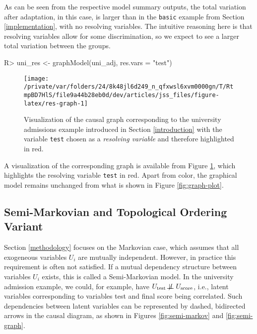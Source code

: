 \documentclass[
  nojss]{jss}
\begin{document}
As can be seen from the respective model summary outputs, the total
variation after adaptation, in this case, is larger than in the
\texttt{basic} example from Section \ref{implementation}, with no
resolving variables. The intuitive reasoning here is that resolving
variables allow for some discrimination, so we expect to see a larger
total variation between the groups.

\begin{CodeChunk}
\begin{CodeInput}
R> uni_res <- graphModel(uni_adj, res.vars = "test")
\end{CodeInput}
\end{CodeChunk}

\begin{CodeChunk}
\begin{figure}

{\centering \texttt{[image: /private/var/folders/24/8k48jl6d249\_n\_qfxwsl6xvm0000gn/T/RtmpBD7HlS/file9a44b28eb0d/dev/articles/jss\_files/figure-latex/res-graph-1]} 

}

\caption[Visualization of the causal graph corresponding to the university admissions example introduced in Section \ref{introduction} with the variable \texttt{test} chosen as a \textit{resolving variable} and therefore highlighted in red]{Visualization of the causal graph corresponding to the university admissions example introduced in Section \ref{introduction} with the variable \texttt{test} chosen as a \textit{resolving variable} and therefore highlighted in red.}\label{fig:res-graph}
\end{figure}
\end{CodeChunk}

A visualization of the corresponding graph is available from Figure
\ref{fig:res-graph}, which highlights the resolving variable
\texttt{test} in red. Apart from color, the graphical model remains
unchanged from what is shown in Figure \ref{fig:graph-plot}.

\hypertarget{semi-markovian-and-topological-ordering-variant}{%
\subsection{Semi-Markovian and Topological Ordering
Variant}\label{semi-markovian-and-topological-ordering-variant}}

Section \ref{methodology} focuses on the Markovian case, which assumes
that all exogeneous variables \(U_i\) are mutually independent. However,
in practice this requirement is often not satisfied. If a mutual
dependency structure between variables \(U_i\) exists, this is called a
Semi-Markovian model. In the university admission example, we could, for
example, have
\(U_{\text{test}} \not\!\perp\!\!\!\perp U_{\text{score}}\), i.e.,
latent variables corresponding to variables test and final score being
correlated. Such dependencies between latent variables can be
represented by dashed, bidirected arrows in the causal diagram, as shown
in Figures \ref{fig:semi-markov} and \ref{fig:semi-graph}.
\end{document}
